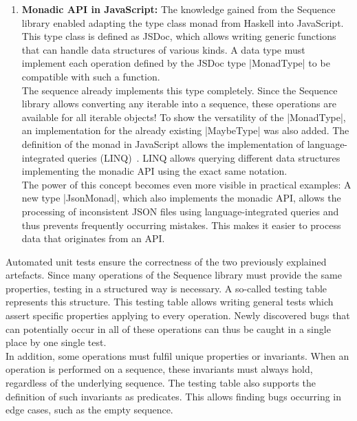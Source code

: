 \begin{enumerate}
\item \textbf{Monadic API in JavaScript:} The knowledge gained from the
  Sequence library enabled adapting the type class monad from Haskell into
  JavaScript. This type class is defined as JSDoc, which allows writing generic
  functions that can handle data structures of various kinds. 
  A data type must implement each operation defined by the JSDoc type
  |MonadType| to be compatible with such a function. \\ 
  The sequence already implements this type completely. Since the Sequence
  library allows converting any iterable into a sequence, these operations are
  available for all iterable objects! To show the versatility of the
  |MonadType|, an implementation for the already existing |MaybeType| was
  also added. The definition of the monad in JavaScript allows the
  implementation of language-integrated queries
  (LINQ)~\cite{billwagner_language-integrated_2023}. LINQ allows querying
  different data structures implementing the monadic API using the exact same
  notation. \\ 
  The power of this concept becomes even more visible in practical examples: A
  new type |JsonMonad|, which also implements the monadic API, allows the
  processing of inconsistent JSON files using language-integrated queries and
  thus prevents frequently occurring mistakes. This makes it easier to process
  data that originates from an API.
\end{enumerate}

Automated unit tests ensure the correctness of the two previously explained
artefacts. Since many operations of the Sequence library must provide the same
properties, testing in a structured way is necessary. A so-called testing
table represents this structure. This testing table allows writing general
tests which assert specific properties applying to every operation. Newly
discovered bugs that can potentially occur in all of these operations can thus
be caught in a single place by one single test.\\
In addition, some operations must fulfil unique properties or invariants. When
an operation is performed on a sequence, these invariants must always hold,
regardless of the underlying sequence. The testing table also
supports the definition of such invariants as predicates. This allows finding
bugs occurring in edge cases, such as the empty sequence.

